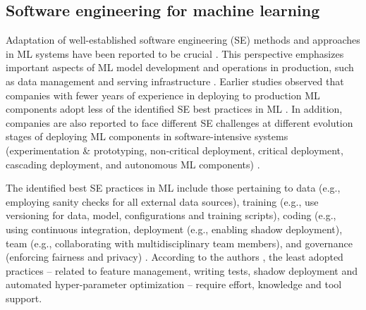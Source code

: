
\subsection{Software engineering for machine learning}
Adaptation of well-established software engineering (SE) methods and approaches in ML systems have been reported to be crucial \cite{Amershi2019}. This perspective emphasizes important aspects of ML model development and operations in production, such as data management and serving infrastructure \cite{Sculley2015}. Earlier studies observed that companies with fewer years of experience in deploying to production ML components adopt less of the identified SE best practices in ML \cite{Serban2020Practices}. In addition, companies are also reported to face different SE challenges at different evolution stages of deploying ML components in software-intensive systems (experimentation \& prototyping, non-critical deployment, critical deployment, cascading deployment, and autonomous ML components) \cite{Lwakatare2019}.


The identified best SE practices in ML include those pertaining to data (e.g., employing sanity checks for all external data sources), training (e.g., use versioning for data, model, configurations and training scripts), coding (e.g., using continuous integration, deployment (e.g., enabling shadow deployment), team (e.g., collaborating with multidisciplinary team members), and governance (enforcing fairness and privacy) \cite{Serban2020Practices}. According to the authors \cite{Serban2020Practices}, the least adopted practices -- related to feature management, writing tests, shadow deployment and automated hyper-parameter optimization -- require effort, knowledge and tool support. 


